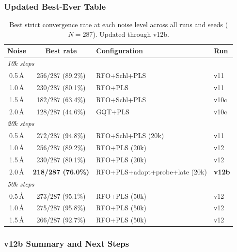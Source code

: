 \documentclass[11pt,a4paper]{article}
\theoremstyle{definition}
\begin{document}
\subsubsection{Updated Best-Ever Table}
\label{sec:v12b-best-ever}

\begin{table}[h]
\centering
\caption{Best strict convergence rate at each noise level across all runs
  and seeds ($N=287$).  Updated through v12b.}
\label{tab:best-ever-v12b}
\begin{tabular}{ccll}
\toprule
Noise & Best rate & Configuration & Run \\
\midrule
\multicolumn{4}{l}{\emph{10k steps}} \\
0.5\,\AA & 256/287 (89.2\%) & RFO+Schl+PLS       & v11 \\
1.0\,\AA & 230/287 (80.1\%) & RFO+PLS             & v11 \\
1.5\,\AA & 182/287 (63.4\%) & RFO+Schl+PLS        & v10c \\
2.0\,\AA & 128/287 (44.6\%) & GQT+PLS             & v10c \\
\midrule
\multicolumn{4}{l}{\emph{20k steps}} \\
0.5\,\AA & 272/287 (94.8\%) & RFO+Schl+PLS (20k)  & v11 \\
1.0\,\AA & 256/287 (89.2\%) & RFO+PLS (20k)        & v12 \\
1.5\,\AA & 230/287 (80.1\%) & RFO+PLS (20k)        & v12 \\
2.0\,\AA & \textbf{218/287 (76.0\%)} & RFO+PLS+adapt+probe+late (20k) & \textbf{v12b} \\
\midrule
\multicolumn{4}{l}{\emph{50k steps}} \\
0.5\,\AA & 273/287 (95.1\%) & RFO+PLS (50k)  & v12 \\
1.0\,\AA & 275/287 (95.8\%) & RFO+PLS (50k)  & v12 \\
1.5\,\AA & 266/287 (92.7\%) & RFO+PLS (50k)  & v12 \\
\bottomrule
\end{tabular}
\end{table}

\subsubsection{v12b Summary and Next Steps}
\label{sec:v12b-summary}
\end{document}
